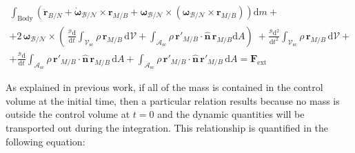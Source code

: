 \begin{multline}
	\int_{\text{Body}}\left(\ddot{\bm{r}}_{B/N} + \dot{\bm{\omega}}_{\mathcal{B}/\mathcal{N}}\times\bm{r}_{M/B} + \bm{\omega}_{\mathcal{B}/\mathcal{N}} \times\left(\bm{\omega}_{\mathcal{B}/\mathcal{N}} \times\bm{r}_{M/B}\right)\right)\text{d}m +\\+
	2\,\bm{\omega}_{\mathcal{B}/\mathcal{N}}\times\left(\,\frac{^{\mathcal{B}} \text{d}}{\text{d}t}\int_{\mathcal{V}_{\text{sc}}} \rho\,\bm{r}_{M/B}\,\text{d}\mathcal{V} + \int_{\mathcal{A}_{\text{sc}}} \rho\,\bm{r}'_{M/B}\cdot\bm{\hat{n}}\,\bm{r}_{M/B}\text{d}A\right) \;+ 	 \frac{^{\mathcal{B}} \text{d}^2}{\text{d}t^2}\int_{\mathcal{V}_{\text{sc}}} \rho\,\bm{r}_{M/B} \,\text{d}\mathcal{V} +\\+ \frac{^{\mathcal{B}} \text{d}}{\text{d}t} \int_{\mathcal{A}_\text{sc}} \rho\,\bm{r}'_{M/B}\cdot\bm{\hat{n}} \,\bm{r}_{M/B}\,\text{d}A + \int_{\mathcal{A}_\text{sc}} \rho\,\bm{r}'_{M/B}\cdot\bm{\hat{n}} \,\bm{r}'_{M/B}\,\text{d}A  
	= \bm{F}_{\text{ext}}
\end{multline} 

As explained in previous work, if all of the mass is contained in the control volume at the initial time, then a particular relation results because no mass is outside the control volume at $t=0$ and the dynamic quantities will be transported out during the integration. This relationship is quantified in the following equation:

